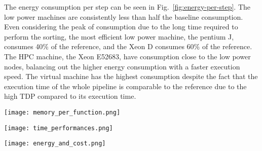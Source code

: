 \documentclass{standalone}
\begin{document}
The energy consumption per step can be seen in Fig.~\ref{fig:energy-per-step}.
The low power machines are consistently less than half the baseline consumption.
Even considering the peak of consumption due to the long time required to perform the sorting, the most efficient low power machine, the pentium J, consumes 40\% of the reference, and the Xeon D consumes 60\% of the reference.
The HPC machine, the Xeon E52683, have consumption close to the low power nodes, balancing out the higher energy consumption with a faster execution speed.
The virtual machine has the highest consumption despite the fact that the execution time of the whole pipeline is comparable to the reference due to the high TDP compared to its execution time.

\begin{figure*}[t!]
\centering
\texttt{[image: memory\_per\_function.png]}
\caption{Memory used for each step of the pipeline. Due to the GATK memory allocation strategy, all steps use a baseline amount of memory proportional to the available memory. Smaller nodes, like the low power ones, require more memory as the baseline allocated memory is not sufficient to perform the calculation.}
\label{fig:memory-per-step}
\end{figure*}

\begin{figure*}[t!]
\centering
\texttt{[image: time\_performances.png]}
\caption{Time elapsed per step of the pipeline, and total elapsed time. In the sorting step, Pentium J is 20 times slower than the reference, probably due to the limited cache size.}
\label{fig:performance-per-step}
\end{figure*}

\begin{figure*}[t!]
\centering
\texttt{[image: energy\_and\_cost.png]}
\caption{Energy consumption per pipeline step and on the whole pipeline.
Energy consumption is estimated as the time taken by the step, multiplied by the number of cores used in the step and the power consumption per core (TDP divided by the available cores).
}
\label{fig:energy-per-step}
\end{figure*}
\end{document}
